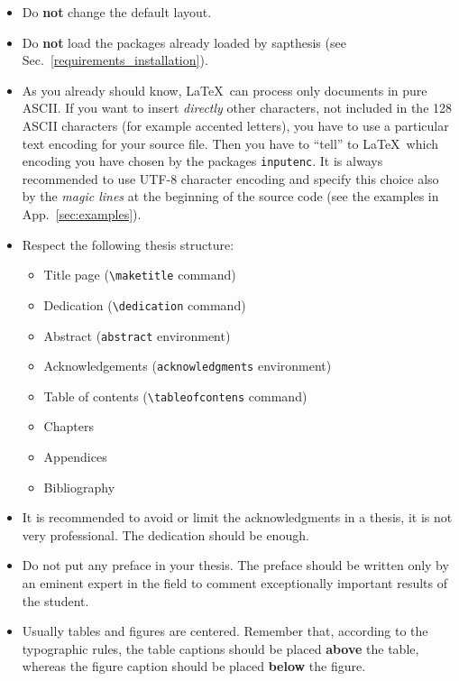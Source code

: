 \documentclass[a5paper,11pt]{article}
\newcommand{\bs}{\textbackslash}
\begin{document}
\begin{itemize}

\item Do \textbf{not} change the default layout.

\item Do \textbf{not} load the packages already loaded by \textsf{sapthesis} (see Sec.~\ref{requirements_installation}).

\item As you already should know, \LaTeX\ can process only documents
in pure ASCII. If you want to insert \emph{directly} other characters, not included in the 128 ASCII characters (for example accented letters), you have to use a particular text encoding for your source file. Then you have to ``tell'' to \LaTeX\ which encoding you have chosen by the packages \texttt{inputenc}. It is always recommended to use UTF-8 character encoding and specify this choice also by the \emph{magic lines} at the beginning of the source code (see the examples in App.~\ref{sec:examples}).

\item Respect the following thesis structure:

\begin{itemize}
\item Title page (\texttt{\bs maketitle} command)
\item Dedication (\texttt{\bs dedication} command)
\item Abstract (\texttt{abstract} environment)
\item Acknowledgements (\texttt{acknowledgments} environment)
\item Table of contents (\texttt{\bs tableofcontens} command)
\item Chapters
\item Appendices
\item Bibliography
\end{itemize}

\item It is recommended to avoid or limit the acknowledgments in a thesis, it 
is not very professional. The dedication should be enough.

\item Do not put any preface in your thesis. The preface should be written only by an eminent expert in the field to comment exceptionally important results of the student.

\item Usually tables and figures are centered. Remember that, according to the typographic rules, the table captions should be placed \textbf{above} the table, whereas the figure caption should be placed \textbf{below} the figure.


\end{itemize}
\end{document}
